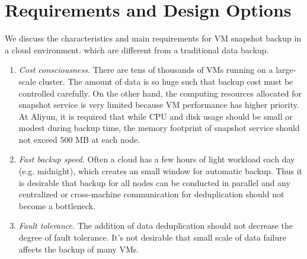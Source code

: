 \section{Requirements and Design Options}
\label{inline:options}
We discuss the characteristics and 
main requirements for VM snapshot backup in a cloud environment.
which are different from a traditional data backup. 
\begin{enumerate}
\item {\em Cost consciousness.}
There are tens of thousands of VMs running on a large-scale cluster. 
The amount of data is so huge such that backup cost must be controlled carefully.
On the other hand, the computing resources allocated for snapshot service is very limited
because VM performance has higher priority.  
At Aliyun, it is required that while CPU and disk usage should be small or modest during backup time,
the memory footprint of snapshot service should not exceed 500 MB at each node.

\item {\em Fast backup speed.}
Often a cloud has a few hours of light workload each day (e.g. midnight),  which creates an small window for automatic backup.
Thus it is desirable that backup for all nodes
can be conducted in parallel and any centralized or  cross-machine communication for
deduplication should not become a bottleneck.

\item {\em Fault tolerance.}
The addition of data deduplication should not decrease the degree of
fault tolerance. It's not desirable that small scale of data failure affects the backup of many VMs.
\end{enumerate}

